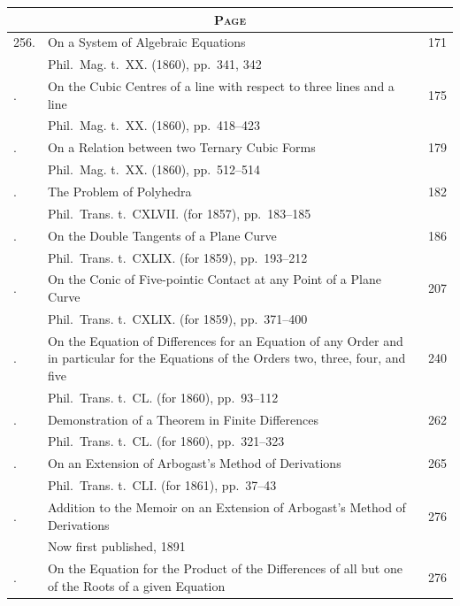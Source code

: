 \documentclass[11pt,a4paper]{book}
\theoremstyle{plain}
\begin{document}
\thispagestyle{empty}
\begin{longtable}{p{0.5in}p{3.8in}p{0.4in}}
\multicolumn{3}{c}{\textsc{Page}} \\
\midrule
\endhead
256. & On a System of Algebraic Equations \dotfill & 171 \\
& \quad Phil.\ Mag. t.~XX. (1860), pp.~341, 342 & \\
\addlinespace
257. & On the Cubic Centres of a line with respect to three lines and a line \dotfill & 175 \\
& \quad Phil.\ Mag. t.~XX. (1860), pp.~418--423 & \\
\addlinespace
258. & On a Relation between two Ternary Cubic Forms \dotfill & 179 \\
& \quad Phil.\ Mag. t.~XX. (1860), pp.~512--514 & \\
\addlinespace
259. & The Problem of Polyhedra \dotfill & 182 \\
& \quad Phil.\ Trans. t.~CXLVII. (for 1857), pp.~183--185 & \\
\addlinespace
260. & On the Double Tangents of a Plane Curve \dotfill & 186 \\
& \quad Phil.\ Trans. t.~CXLIX. (for 1859), pp.~193--212 & \\
\addlinespace
261. & On the Conic of Five-pointic Contact at any Point of a Plane Curve \dotfill & 207 \\
& \quad Phil.\ Trans. t.~CXLIX. (for 1859), pp.~371--400 & \\
\addlinespace
262. & On the Equation of Differences for an Equation of any Order and in particular for the Equations of the Orders two, three, four, and five \dotfill & 240 \\
& \quad Phil.\ Trans. t.~CL. (for 1860), pp.~93--112 & \\
\addlinespace
263. & Demonstration of a Theorem in Finite Differences \dotfill & 262 \\
& \quad Phil.\ Trans. t.~CL. (for 1860), pp.~321--323 & \\
\addlinespace
264. & On an Extension of Arbogast's Method of Derivations \dotfill & 265 \\
& \quad Phil.\ Trans. t.~CLI. (for 1861), pp.~37--43 & \\
\addlinespace
265. & Addition to the Memoir on an Extension of Arbogast's Method of Derivations \dotfill & 276 \\
& \quad Now first published, 1891 & \\
\addlinespace
266. & On the Equation for the Product of the Differences of all but one of the Roots of a given Equation \dotfill & 276 \\

\end{longtable}
\end{document}
